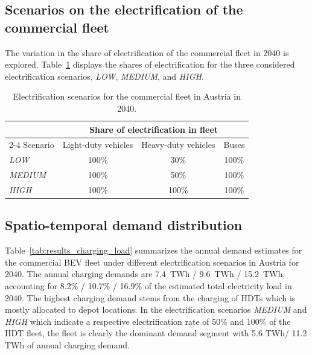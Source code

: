          \subsection{Scenarios on the electrification of the commercial fleet}
            The variation in the share of electrification of the commercial fleet in 2040 is explored. Table~\ref{tab:parameters_scenario} displays the shares of electrification for the three considered electrification scenarios, \textit{LOW}, \textit{MEDIUM}, and \textit{HIGH}. 
            \begin{table}[H]
                \centering
                \caption{Electrification scenarios for the commercial fleet in Austria in 2040.}
                \label{tab:parameters_scenario}
                \begin{tabular*}{\textwidth}{@{\extracolsep{\fill}}lccc@{}}
                \toprule
                 & \multicolumn{3}{c}{Share of electrification in fleet} \\ \cmidrule(l){2-4}
                Scenario & Light-duty vehicles & Heavy-duty vehicles & Buses \\
                \midrule
                \textit{LOW}    & 100\%            & 30\%             & 100\%           \\
                \textit{MEDIUM} & 100\%            & 50\%             & 100\%           \\
                \textit{HIGH}   & 100\%            & 100\%            & 100\%           \\ \bottomrule
                \end{tabular*}
                \end{table}
\subsection{Spatio-temporal demand distribution}
    Table~\ref{tab:results_charging_load} summarizes the annual demand estimates for the commercial \ac{BEV} fleet under different electrification scenarios in Austria for 2040. The annual charging demands are 7.4~TWh / 9.6~TWh / 15.2~TWh, accounting for 8.2\% / 10.7\% / 16.9\% of the estimated total electricity load in 2040. The highest charging demand stems from the charging of \acp{HDT} which is mostly allocated to depot locations. In the electrification scenarios \textit{MEDIUM} and \textit{HIGH} which indicate a respective electrification rate of 50\% and 100\% of the \ac{HDT} fleet, the fleet is clearly the dominant demand segment with 5.6 TWh/ 11.2 TWh of annual charging demand. 

